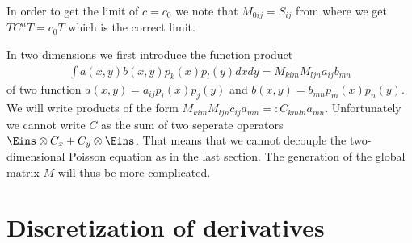 \documentclass[a4paper,12pt]{scrartcl}
\begin{document}
In order to get the limit of $c = c_0$ we note that $M_{0ij} = S_{ij}$ from where
we get $TC^nT = c_0T$ which is the correct limit.


In two dimensions we first introduce the function product 
\begin{align}
    \int a(x,y)b(x,y) p_k(x)p_l(y) dxdy = M_{kim}M_{ljn}a_{ij}b_{mn}
    \label{}
\end{align}
of two function $a(x,y) = a_{ij}p_i(x)p_j(y)$ and $b(x,y) = b_{mn}p_m(x)p_n(y)$.
We will write products of the form $M_{kim}M_{ljn}c_{ij}a_{mn} =: C_{kmln}a_{mn}$. 
Unfortunately we cannot write $C$ as the sum of two seperate operators
$\Eins\otimes C_x + C_y\otimes \Eins$. That means that we cannot decouple the
two-dimensional Poisson equation as in the last section. 
The generation of the global matrix $M$ will
thus be more complicated.



\section{ Discretization of derivatives}
\end{document}
